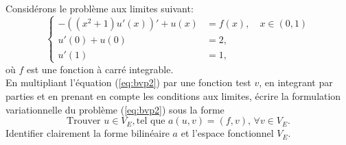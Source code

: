 \documentclass[12pt,a4paper]{article}
\begin{document}
 \\ 
Considérons le problème aux limites suivant:
 \begin{equation}\label{eq:bvp2}
\left\{\begin{array}{rl}
-((x^2+1)u'(x))' + u(x) &= f(x), \quad x\in (0,1)\\
 u'(0)+u(0) &= 2,\\
 u'(1) &= 1,
 \end{array}\right.
 \end{equation}
 où $f$ est une fonction à carré integrable.\\
En multipliant l'équation (\ref{eq:bvp2}) par une fonction test $v$, en integrant par parties et en prenant en compte les conditions aux limites, écrire la formulation variationnelle du problème (\ref{eq:bvp2}) sous la forme
$$
\mbox{Trouver } u\in V_E, \mbox{tel que } a(u,v) = (f,v),\, \forall v\in V_E.
$$
Identifier clairement la forme bilinéaire $a$ et l'espace fonctionnel $V_E$.
\end{document}
